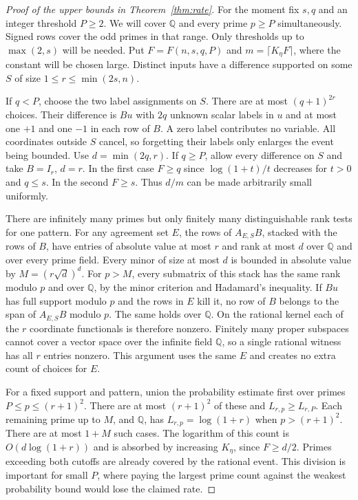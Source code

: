 \documentclass[11pt,letterpaper]{article}
\numberwithin{equation}{section}
\begin{document}
\begin{proof}[Proof of the upper bounds in Theorem~\ref{thm:rate}]

For the moment fix $s,q$ and an integer threshold $P\ge2$. We will cover $\mathbb Q$ and every
prime $p\ge P$ simultaneously. Signed rows cover the odd primes in that range. Only thresholds
up to $\max(2,s)$ will be needed. Put $F=F(n,s,q,P)$ and $m=\lceil K_\eta F\rceil$, where the
constant will be chosen large. Distinct inputs have a difference supported on some $S$ of size
$1\le r\le\min(2s,n)$.

If $q<P$, choose the two label assignments on $S$. There are at most $(q+1)^{2r}$ choices.
Their difference is $Bu$ with $2q$ unknown scalar labels in $u$ and at most one $+1$ and one
$-1$ in each row of $B$. A zero label contributes no variable. All coordinates outside $S$
cancel, so forgetting their labels only enlarges the event being bounded. Use $d=\min(2q,r)$.
If $q\ge P$, allow every difference on $S$ and take $B=I_r$, $d=r$. In the first case $F\ge q$
since $\log(1+t)/t$ decreases for $t>0$ and $q\le s$. In the second $F\ge s$. Thus $d/m$ can
be made arbitrarily small uniformly.

There are infinitely many primes but only finitely many distinguishable rank tests for one
pattern. For any agreement set $E$, the rows of $A_{E,S}B$, stacked with the rows of $B$, have
entries of absolute value at most $r$ and rank at most $d$ over $\mathbb Q$ and over every
prime field. Every minor of size at most $d$ is bounded in absolute value by $M=(r\sqrt d)^d$.
For $p>M$, every submatrix of this stack has the same rank modulo $p$ and over $\mathbb Q$, by
the minor criterion and Hadamard's inequality. If $Bu$ has full support modulo $p$ and the
rows in $E$ kill it, no row of $B$ belongs to the span of $A_{E,S}B$ modulo $p$. The same
holds over $\mathbb Q$. On the rational kernel each of the $r$ coordinate functionals is
therefore nonzero. Finitely many proper subspaces cannot cover a vector space over the
infinite field $\mathbb Q$, so a single rational witness has all $r$ entries nonzero. This
argument uses the same $E$ and creates no extra count of choices for $E$.

For a fixed support and pattern, union the probability estimate first over primes $P\le
p\le(r+1)^2$. There are at most $(r+1)^2$ of these and $L_{r,p}\ge L_{r,P}$. Each remaining
prime up to $M$, and $\mathbb Q$, has $L_{r,p}=\log(1+r)$ when $p>(r+1)^2$. There are at most
$1+M$ such cases. The logarithm of this count is $O(d\log(1+r))$ and is absorbed by increasing
$K_\eta$, since $F\ge d/2$. Primes exceeding both cutoffs are already covered by the rational
event. This division is important for small $P$, where paying the largest prime count against
the weakest probability bound would lose the claimed rate.


\end{proof}
\end{document}

